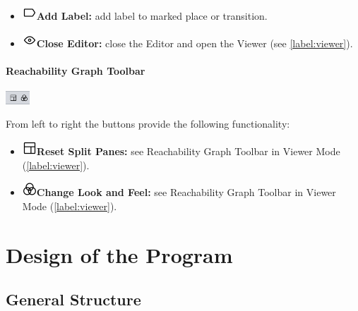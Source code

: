 \documentclass[10pt, a4paper]{article}
\begin{document}
\begin{itemize}
\item\includegraphics[scale=0.4]{../../src/resources/images/Toolbar/label.png}\hspace{0.1cm}\textbf{Add Label:} add label to marked place or transition.
\item\includegraphics[scale=0.4]{../../src/resources/images/Toolbar/eye.png}\hspace{0.1cm}\textbf{Close Editor:} close the Editor and open the Viewer (see \ref{label:viewer}).
\end{itemize}


\paragraph{Reachability Graph Toolbar}

\includegraphics[height=0.5cm]{Editor_Reachability.png}

From left to right the buttons provide the following functionality:
\begin{itemize}
\item\includegraphics[scale=0.4]{../../src/resources/images/Toolbar/layout.png}\hspace{0.1cm}\textbf{Reset Split Panes:} see Reachability Graph Toolbar in Viewer Mode (\ref{label:viewer}).
\item\includegraphics[scale=0.4]{../../src/resources/images/Toolbar/design.png}\hspace{0.1cm}\textbf{Change Look and Feel:} see Reachability Graph Toolbar in Viewer Mode (\ref{label:viewer}).
\end{itemize}

\section{Design of the Program}


\subsection{General Structure}
\end{document}
